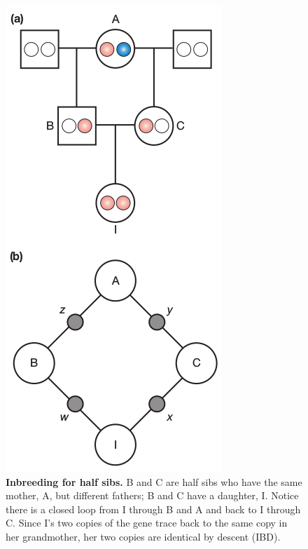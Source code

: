 \documentclass[11pt,dvipsnames,ignorenonframetext,aspectratio=169]{beamer}
\begin{document}
\begin{frame}{}
\begin{columns}
\begin{figure}
\includegraphics[width=0.65\linewidth]{../images/inbreeding_coefficient_half_sibs} \caption{\textbf{Inbreeding for half sibs.} B and C are half sibs who have the same mother, A, but different fathers; B and C have a daughter, I. Notice there is a closed loop from I through B and A and back to I through C. Since I's two copies of the gene trace back to the same copy in her grandmother, her two copies are identical by descent (IBD).}\label{fig:inbreeding-coefficient-in-half-sibs}
\end{figure}

\end{columns}
\end{frame}
\end{document}
